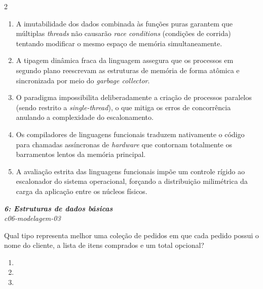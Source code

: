 \documentclass[a4paper,10pt,brazil]{article}
\begin{document}
\begin{multicols}{2}
\begin{enumerate}
  \item A imutabilidade dos dados combinada às funções puras garantem que múltiplas \emph{threads} não causarão \emph{race conditions} (condições de corrida) tentando modificar o mesmo espaço de memória simultaneamente.

  \item A tipagem dinâmica fraca da linguagem assegura que os processos em segundo plano reescrevam as estruturas de memória de forma atômica e sincronizada por meio do \emph{garbage collector}.

  \item O paradigma impossibilita deliberadamente a criação de processos paralelos (sendo restrito a \emph{single-thread}), o que mitiga os erros de concorrência anulando a complexidade do escalonamento.

  \item Os compiladores de linguagens funcionais traduzem nativamente o código para chamadas assíncronas de \emph{hardware} que contornam totalmente os barramentos lentos da memória principal.

  \item A avaliação estrita das linguagens funcionais impõe um controle rígido ao escalonador do sistema operacional, forçando a distribuição milimétrica da carga da aplicação entre os núcleos físicos.


\end{enumerate}

\begin{flushright}
  \footnotesize
  \textit{\textbf{6: Estruturas de dados básicas}}\\
  \textit{c06-modelagem-03}\\

\end{flushright}
Qual tipo representa melhor uma coleção de pedidos em que cada pedido possui o nome do cliente, a lista de itens comprados e um total opcional?

\begin{enumerate}
  \item {}

  \item {}

  \item {}


\end{enumerate}
\end{multicols}
\end{document}
